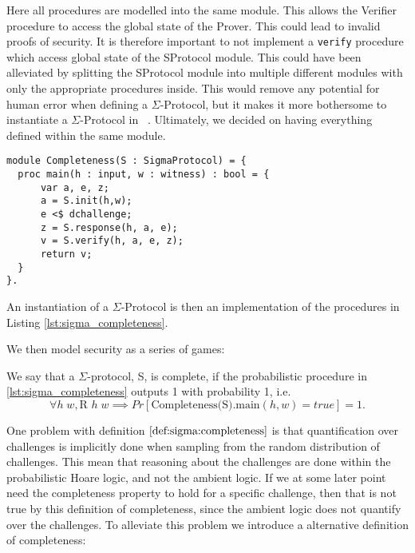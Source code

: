 Here all procedures are modelled into the same module. This allows the
Verifier procedure to access the global state of the Prover. This could lead to
invalid proofs of security. It is therefore important to not implement a
\texttt{verify} procedure which access global state of the SProtocol module.
This could have been alleviated by splitting the SProtocol module into multiple
different modules with only the appropriate procedures inside. This would remove
any potential for human error when defining a $\Sigma$-Protocol, but it makes it
more bothersome to instantiate a $\Sigma$-Protocol in \easycrypt\ . Ultimately,
we decided on having everything defined within the same module.


\begin{lstlisting}[float, label=lst:sigma_completeness,caption=Completeness game for $\Sigma$-Protocols]
module Completeness(S : SigmaProtocol) = {
  proc main(h : input, w : witness) : bool = {
      var a, e, z;
      a = S.init(h,w);
      e <$ dchallenge;
      z = S.response(h, a, e);
      v = S.verify(h, a, e, z);
      return v;
  }
}.
\end{lstlisting}

An instantiation of a $\Sigma$-Protocol is then an implementation of the
procedures in Listing \ref{lst:sigma_completeness}.

We then model security as a series of games:

\begin{definition}[Completeness]
\label{def:sigma:completeness}
  We say that a $\Sigma$-protocol, S, is complete, if the probabilistic procedure in
  \ref{lst:sigma_completeness} outputs 1 with probability 1, i.e.
  \begin{equation}
    \label{eq:sigma_completeness}
    \forall h \; w, \text{R } h \; w \implies Pr[\text{Completeness(S).main}(h,w) = true] = 1.
  \end{equation}
\end{definition}

One problem with definition $\ref{def:sigma:completeness}$ is that
quantification over challenges is implicitly done when sampling from the random
distribution of challenges. This mean that reasoning about the challenges are
done within the probabilistic Hoare logic, and not the ambient logic. If we at
some later point need the completeness property to hold for a specific
challenge, then that is not true by this definition of completeness, since
the ambient logic does not quantify over the challenges. To alleviate this
problem we introduce a alternative definition of completeness:

